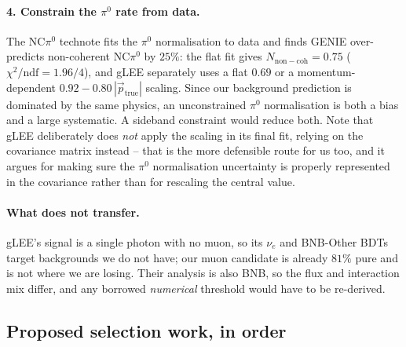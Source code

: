 \documentclass[11pt,a4paper]{article}
\begin{document}
\paragraph{4. Constrain the $\pi^0$ rate from data.} The NC$\pi^0$ technote fits the
$\pi^0$ normalisation to data and finds GENIE over-predicts non-coherent NC$\pi^0$ by
$25\%$: the flat fit gives $N_{\mathrm{non-coh}} = 0.75$ ($\chi^2/\mathrm{ndf} =
1.96/4$), and gLEE separately uses a flat $0.69$ or a momentum-dependent
$0.92 - 0.80\,|\vec{p}_{\mathrm{true}}|$ scaling. Since our background prediction is
dominated by the same physics, an unconstrained $\pi^0$ normalisation is both a bias
and a large systematic. A sideband constraint would reduce both. Note that gLEE
deliberately does \emph{not} apply the scaling in its final fit, relying on the
covariance matrix instead -- that is the more defensible route for us too, and it
argues for making sure the $\pi^0$ normalisation uncertainty is properly represented
in the covariance rather than for rescaling the central value.

\paragraph{What does not transfer.} gLEE's signal is a single photon with no muon,
so its $\nu_e$ and BNB-Other BDTs target backgrounds we do not have; our muon
candidate is already $81\%$ pure and is not where we are losing. Their analysis is
also BNB, so the flux and interaction mix differ, and any borrowed \emph{numerical}
threshold would have to be re-derived.

\subsection{Proposed selection work, in order}
\end{document}
